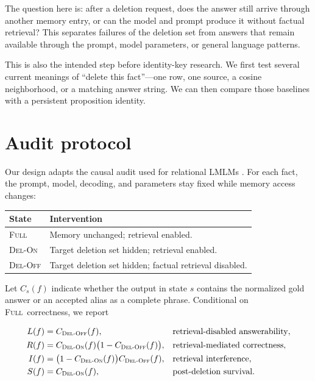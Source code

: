 \documentclass[11pt]{article}
\newcommand{\FULL}{\textsc{Full}}
\newcommand{\DELON}{\textsc{Del-On}}
\newcommand{\DELOFF}{\textsc{Del-Off}}
\begin{document}
The question here is: after a deletion request, does the answer still arrive
through another memory entry, or can the model and prompt produce it without
factual retrieval? This separates failures of the deletion set from answers
that remain available through the prompt, model parameters, or general
language patterns.

This is also the intended step before identity-key research. We first test
several current meanings of ``delete this fact''---one row, one source, a
cosine neighborhood, or a matching answer string. We can then compare those
baselines with a persistent proposition identity.

\section{Audit protocol}

Our design adapts the causal audit used for relational LMLMs
\cite{raeesi2026audit}. For each fact, the prompt, model, decoding, and
parameters stay fixed while memory access changes:

\begin{center}
\begin{tabularx}{0.92\textwidth}{p{}Y}
\toprule
State & Intervention \\
\midrule
\FULL & Memory unchanged; retrieval enabled. \\
\DELON & Target deletion set hidden; retrieval enabled. \\
\DELOFF & Target deletion set hidden; factual retrieval disabled. \\
\bottomrule
\end{tabularx}
\end{center}

Let \(C_s(f)\) indicate whether the output in state \(s\) contains the
normalized gold answer or an accepted alias as a complete phrase. Conditional
on \FULL\ correctness, we report

\begin{align}
L(f) &= C_{\DELOFF}(f),
  &&\text{retrieval-disabled answerability},\\
R(f) &= C_{\DELON}(f)\bigl(1-C_{\DELOFF}(f)\bigr),
  &&\text{retrieval-mediated correctness},\\
I(f) &= \bigl(1-C_{\DELON}(f)\bigr)C_{\DELOFF}(f),
  &&\text{retrieval interference},\\
S(f) &= C_{\DELON}(f),
  &&\text{post-deletion survival}.
\end{align}
\end{document}
